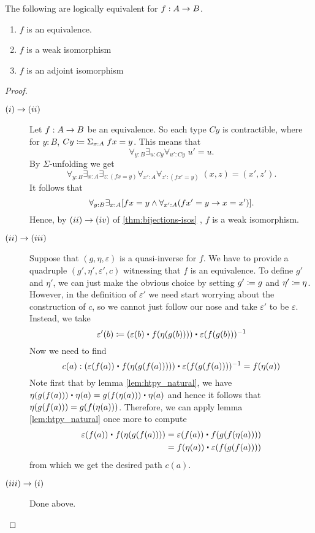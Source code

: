 \begin{thm}\label{thm:equiv-iso-adj} The following are logically equivalent for $f:A\rightarrow B$.
\begin{enumerate}
\item $f$ is an equivalence.
\item $f$ is a weak isomorphism
\item $f$ is an adjoint isomorphism
\end{enumerate}
\end{thm}
\begin{proof} $\;$

\begin{description}
\item[$(i)\rightarrow (ii)$] 
Let $f:A\rightarrow B$ be an equivalence.  So each type $Cy$ is contractible, where for $y:B$, $Cy \coloneqq \Sigma_{x:A}\; fx=y$.  This means that
  \[ \forall_{y:B}\exists_{u:Cy}\forall_{u':Cy}\; u'=u.\]
By $\Sigma$-unfolding we get
  \[ \forall_{y:B}\exists_{x:A}\exists_{z:(fx=y)}
                            \forall_{x':A}\forall_{z':(fx'=y)}\; (x,z)=(x',z').
  \]
It follows that
  \[ \forall_{y:B}\exists_{x:A}[fx=y\wedge\forall_{x':A}(fx'=y\rightarrow  x=x')].
  \]
Hence, by $(ii)\rightarrow (iv)$ of \autoref{thm:bijections-isos} , $f$ is a weak isomorphism.
\item[$(ii)\rightarrow (iii)$] Suppose that $(g,\eta,\varepsilon)$ is a quasi-inverse for $f$. We have to provide
a quadruple $(g',\eta',\varepsilon',c)$ witnessing that $f$ is an equivalence. To
define $g'$ and $\eta'$, we can just make the obvious choice by setting $g'
\coloneqq g$ and $\eta'\coloneqq \eta$. However, in the definition of $\varepsilon'$ we
need start worrying about the construction of $c$, so we cannot just follow our nose
and take $\varepsilon'$ to be $\varepsilon$. Instead, we take
\begin{equation*}
\varepsilon'(b) \defeq (\varepsilon(b)\ct \ap{f}{\eta(g(b))})\ct \varepsilon(f(g(b)))^{-1}
\end{equation*}
Now we need to find
\begin{equation*}
c(a):(\varepsilon(f(a))\ct \ap{f}{\eta(g(f(a)))})\ct \varepsilon(f(g(f(a))))^{-1}=\ap{f}{\eta(a)}
\end{equation*}
Note first that by lemma \ref{lem:htpy_natural}, we have 
$\eta(g(f(a)))\ct\eta(a)=\ap{g}{\ap{f}{\eta(a)}}\ct\eta(a)$ and hence it follows
that $\eta(g(f(a)))={g}\!\left({{f}\!\left({\eta(a)}\right)}\right)$. Therefore, we can apply lemma
\ref{lem:htpy_natural} once more to compute
\begin{align*}
\varepsilon(f(a))\ct \ap{f}{\eta(g(f(a)))}
& = \varepsilon(f(a))\ct \ap{f}{\ap{g}{\ap{f}{\eta(a)}}}\\
& = \ap{f}{\eta(a)}\ct\varepsilon(f(g(f(a))))
\end{align*}
from which we get the desired path $c(a)$.

\item[$(iii)\rightarrow (i)$] Done above.

\end{description}
\end{proof}
